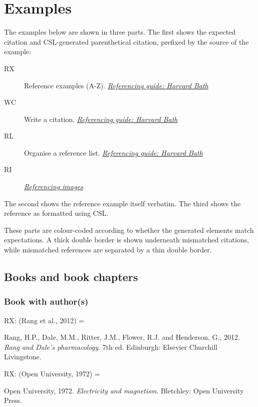 \frenchspacing

\section{Examples}

The examples below are shown in three parts.
The first shows the expected citation and CSL-generated parenthetical citation, prefixed by the source of the example:
\begin{description}
\item[RX]
  Reference examples (A-Z).
  \href{https://library.bath.ac.uk/referencing/harvard-bath}{\emph{Referencing guide: Harvard Bath}}
\item[WC]
  Write a citation.
  \href{https://library.bath.ac.uk/referencing/harvard-bath}{\emph{Referencing guide: Harvard Bath}}
\item[RL]
  Organise a reference list.
  \href{https://library.bath.ac.uk/referencing/harvard-bath}{\emph{Referencing guide: Harvard Bath}}
\item[RI]
  \href{https://library.bath.ac.uk/images/referencing}{\emph{Referencing images}}
\end{description}
The second shows the reference example itself verbatim.
The third shows the reference as formatted using CSL.

These parts are colour-coded according to whether the generated elements match expectations.
A thick double border is shown underneath mismatched citations,
while mismatched references are separated by a thin double border.

\subsection{Books and book chapters}

\subsubsection*{Book with author(s)}

RX: (Rang et al., 2012) = \cite{rang.etal2012rdp}

Rang, H.P., Dale, M.M., Ritter, J.M., Flower, R.J. and Henderson, G., 2012. \emph{Rang and Dale's pharmacology}. 7th ed. Edinburgh: Elsevier Churchill Livingstone.


RX: (Open University, 1972) = \cite{ou1972em}

Open University, 1972. \emph{Electricity and magnetism}. Bletchley: Open University Press.


